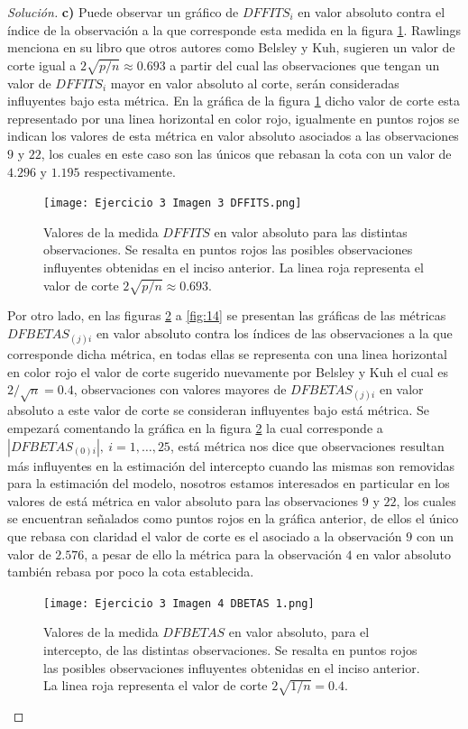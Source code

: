 \documentclass[10.5pt,notitlepage]{article}
\newenvironment{solucion}
  {\begin{proof}[Solución]}
  {\end{proof}}
\newcommand{\abs}[1]{\left\lvert #1 \right\rvert}
\theoremstyle{plain}
\begin{document}
\begin{solucion}
\noindent \textbf{c)} Puede observar un gráfico de \(DFFITS_i\) en valor absoluto contra el índice de la observación a la que corresponde esta medida en la figura \ref{fig:11}. Rawlings menciona en su libro que otros autores como Belsley y Kuh, sugieren un valor de corte igual a \(2\sqrt{p/n} \approx 0.693\) a partir del cual las observaciones que tengan un valor de \(DFFITS_i\) mayor en valor absoluto al corte, serán consideradas influyentes bajo esta métrica. En la gráfica de la figura \ref{fig:11} dicho valor de corte esta representado por una linea horizontal en color rojo, igualmente en puntos rojos se indican los valores de esta métrica en valor absoluto asociados a las observaciones \(9\) y \(22\), los cuales en este caso son las únicos que rebasan la cota con un valor de \(4.296\) y \(1.195\) respectivamente.
\begin{figure}[htb]
 \centering
 \texttt{[image: Ejercicio 3 Imagen 3 DFFITS.png]}
 \caption{Valores de la medida \(DFFITS\) en valor absoluto para las distintas observaciones. Se resalta en puntos rojos las posibles observaciones influyentes obtenidas en el inciso anterior. La linea roja representa el valor de corte \(2\sqrt{p/n} \approx 0.693\).}
\label{fig:11}
\end{figure}
Por otro lado, en las figuras \ref{fig:12} a \ref{fig:14} se presentan las gráficas de las métricas \(DFBETAS_{(j)i}\) en valor absoluto contra los índices de las observaciones a la que corresponde dicha métrica, en todas ellas se representa con una linea horizontal en color rojo el valor de corte sugerido nuevamente por Belsley y Kuh el cual es \(2/\sqrt{n} = 0.4\), observaciones con valores mayores de \(DFBETAS_{(j)i}\) en valor absoluto a este valor de corte se consideran influyentes bajo está métrica. Se empezará comentando la gráfica en la figura \ref{fig:12} la cual corresponde a \(\abs{DFBETAS_{(0)i}} , \ i = 1,\hdots,25 \), está métrica nos dice que observaciones resultan más influyentes en la estimación del intercepto cuando las mismas son removidas para la estimación del modelo, nosotros estamos interesados en particular en los valores de está métrica en valor absoluto para las observaciones \(9\) y \(22\), los cuales se encuentran señalados como puntos rojos en la gráfica anterior, de ellos el único que rebasa con claridad el valor de corte es el asociado a la observación \(9\) con un valor de \(2.576\), a pesar de ello la métrica para la observación \(4\) en valor absoluto también rebasa por poco la cota establecida.\\ 
\begin{figure}[htb]
 \centering
 \texttt{[image: Ejercicio 3 Imagen 4 DBETAS 1.png]}
 \caption{Valores de la medida \(DFBETAS\) en valor absoluto, para el intercepto, de las distintas observaciones. Se resalta en puntos rojos las posibles observaciones influyentes obtenidas en el inciso anterior. La linea roja representa el valor de corte \(2\sqrt{1/n} = 0.4\).}
\label{fig:12}
\end{figure}


\end{solucion}
\end{document}
